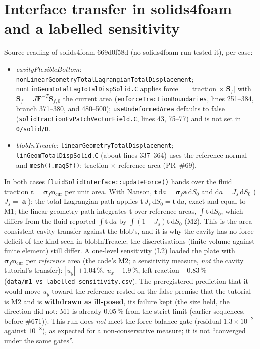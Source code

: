\documentclass[sn-mathphys,Numbered]{sn-jnl}
\newcommand{\legbc}{\textcolor{red!70!black}{(earlier sequences, before \#671)}}
\begin{document}
\section{Interface transfer in solids4foam and a labelled sensitivity}\label{sec:cv_m2}
Source reading of solids4foam 669d0f58d (no solids4foam run tested it), per case:
\begin{itemize}
\item \emph{cavityFlexibleBottom}: \texttt{nonLinearGeometryTotalLagrangianTotalDisplacement}; \texttt{nonLinGeomTotalLagTotalDispSolid.C} applies force $=$ traction $\times|\bm S_f|$ with $\bm S_f=J\bm F^{-T}\bm S_{f,0}$ the current area (\texttt{enforceTractionBoundaries}, lines 251--384, branch 371--380, and 480--500); \texttt{useUndeformedArea} defaults to false (\texttt{solidTractionFvPatchVectorField.C}, lines 43, 75--77) and is not set in \texttt{0/solid/D}.
\item \emph{blobInTreacle}: \texttt{linearGeometryTotalDisplacement}; \texttt{linGeomTotalDispSolid.C} (about lines 337--364) uses the reference normal and \texttt{mesh().magSf()}: traction $\times$ reference area (PR~\#69).
\end{itemize}
In both cases \texttt{fluidSolidInterface::updateForce()} hands over the fluid traction $\bm t=\bm\sigma_f\bm n_\mathrm{cur}$ per unit area. With Nanson, $\bm t\,\mathrm da=\bm\sigma_f\bm a\,\mathrm dS_0$ and $\mathrm da=J_s\,\mathrm dS_0$ ($J_s=|\bm a|$): the total-Lagrangian path applies $\bm t\,J_s\,\mathrm dS_0=\bm t\,\mathrm da$, exact and equal to M1; the linear-geometry path integrates $\bm t$ over reference areas, $\int\bm t\,\mathrm dS_0$, which differs from the fluid-reported $\int\bm t\,\mathrm da$ by $\int(1-J_s)\bm t\,\mathrm dS_0$ (M2). This is the area-consistent cavity transfer against the blob's, and it is why the cavity has no force deficit of the kind seen in blobInTreacle; the discretisations (finite volume against finite element) still differ.
A one-level sensitivity (L2) loaded the plate with $\bm\sigma_f\bm n_\mathrm{cur}$ per \emph{reference} area (the code's M2; a sensitivity measure, \emph{not} the cavity tutorial's transfer): $|u_y|$ $+1.04\,\%$, $u_x$ $-1.9\,\%$, left reaction $-0.83\,\%$ (\texttt{data/m1\_vs\_labelled\_sensitivity.csv}). The preregistered prediction that it would move $u_y$ toward the reference rested on the false premise that the tutorial is M2 and is \textbf{withdrawn as ill-posed}, its failure kept (the size held, the direction did not: M1 is already $0.05\,\%$ from the strict limit \legbc). This run does \emph{not} meet the force-balance gate (residual $1.3\times10^{-2}$ against $10^{-8}$), as expected for a non-conservative measure; it is not ``converged under the same gates''.
\end{document}
